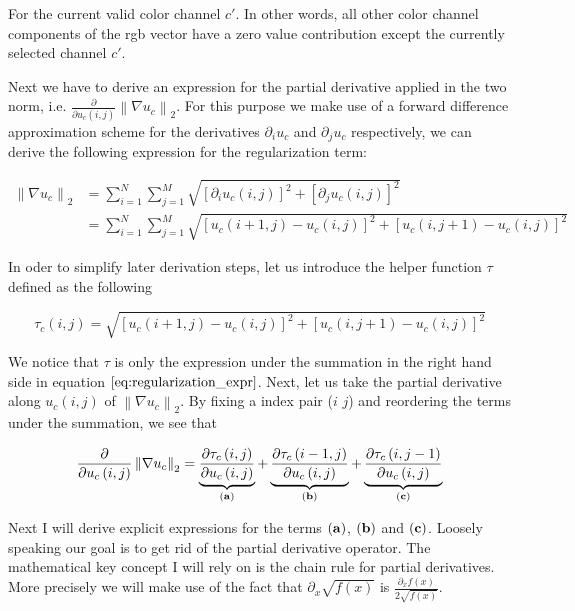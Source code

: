 \documentclass{paper}
\newcommand{\norm}[1]{\left\lVert#1\right\rVert}
\begin{document}
For the current valid color channel $c'$. In other words, all other color channel components of the rgb vector have a zero value contribution except the currently selected channel $c'$.

Next we have to derive an expression for the partial derivative applied in the two norm, i.e. $\frac{\partial}{\partial{u_{c} (i,j)}} \norm{\nabla u_c}_2$. For this purpose we make use of a forward difference approximation scheme for the derivatives $\partial_{i} u_c$ and $\partial_{j} u_c$ respectively, we can derive the following expression for the regularization term:

\begin{align}
	 \norm{\nabla{u_{c}}}_2 
	&= \sum_{i=1}^N \sum_{j=1}^M \sqrt{[\partial_{i} u_c(i,j)]^2 + [\partial_{j} u_c(i,j)]^2} \nonumber \\ 
	&= \sum_{i=1}^N \sum_{j=1}^M \sqrt{\left[ u_{c}\left(i+1, j\right) - u_{c}\left(i,j\right) \right]^2 + \left[ u_{c}\left(i, j+1 \right) - u_{c}\left(i,j\right) \right]^2}
\label{eq:regularization_expr}
\end{align}

In oder to simplify later derivation steps, let us introduce the helper function $\tau$ defined as the following 

\begin{equation}
	 \tau_{c}\left(i,j\right)
	= \sqrt{\left[ u_{c}\left(i+1, j\right) - u_{c}\left(i,j\right) \right]^2 + \left[ u_{c}\left(i, j+1 \right) - u_{c}\left(i,j\right) \right]^2}
\label{eq:tau_function}	
\end{equation}

We notice that $\tau$ is only the expression under the summation in the right hand side in equation $\ref{eq:regularization_expr}$. Next, let us take the partial derivative along $u_{c}(i,j)$ of $\norm{\nabla{u_{c}}}_2$. By fixing a index pair ($i$ $j$) and reordering the terms under the summation, we see that 

\begin{equation}
	\frac{\partial}{\partial u_{c}\left(i,j\right)} \norm{\nabla{u_c}}_2 = \underbrace{\frac{\partial{\tau_{c}\left(i,j\right)}}{\partial u_{c}\left(i,j\right)}}_{\bf{(a)}} + \underbrace{\frac{\partial{\tau_{c}\left(i-1,j\right)}}{\partial u_{c}\left(i,j\right)}}_{\bf{(b)}} + \underbrace{\frac{\partial{\tau_{c}\left(i,j-1\right)}}{\partial u_{c}\left(i,j\right)}}_{\bf{(c)}}
\label{eq:abc_term}
\end{equation}

Next I will derive explicit expressions for the terms $\bf{(a)}$, $\bf{(b)}$ and $\bf{(c)}$. Loosely speaking our goal is to get rid of the partial derivative operator. The mathematical key concept I will rely on is the chain rule for partial derivatives. More precisely we will make use of the fact that $\partial_{x}\sqrt{f(x)}$ is $\frac{\partial_{x} f(x)}{2 \sqrt{f(x)}}$.
\end{document}
